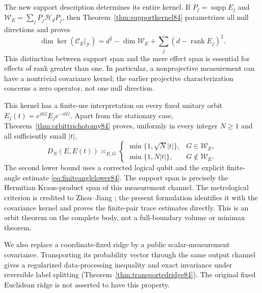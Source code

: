The new support description determines its entire kernel.  If
$P_j=\operatorname{supp}E_j$ and
$\mathcal W_E=\sum_jP_j\mathcal H_dP_j$, then
Theorem~\ref{thm:supportkernel84} parametrizes all null directions
and proves
\[
 \dim\ker(\mathcal C_E|_{\mathcal T})
 =d^2-\dim\mathcal W_E+\sum_j(d-\operatorname{rank}E_j)^2.
\]
This distinction between support span and the mere effect span is
essential for effects of rank greater than one.  In particular,
a nonprojective measurement can have a nontrivial covariance kernel;
the earlier projective characterization concerns a zero operator,
not one null direction.

This kernel has a finite-use interpretation on every fixed unitary
orbit $E_j(t)=e^{itG}E_je^{-itG}$.  Apart from the stationary case,
Theorem~\ref{thm:orbittrichotomy84} proves, uniformly in every integer
$N\ge1$ and all sufficiently small $|t|$,
\begin{equation}\label{eq:frontorbit84}
 D_N(E,E(t))\asymp_{E,G}
 \begin{cases}
 \min\{1,\sqrt N|t|\},&G\in\mathcal W_E,\\
 \min\{1,N|t|\},&G\notin\mathcal W_E.
 \end{cases}
\end{equation}
The second lower bound uses a corrected logical qubit and the explicit
finite-angle estimate \eqref{eq:finiteanglelower84}.
The support span is precisely the Hermitian Kraus-product span of
this measurement channel.  The metrological criterion is credited
to Zhou--Jiang \cite{ZJ84}; the present formulation identifies it
with the covariance kernel and proves the finite-pair trace estimates
directly.  This is an orbit theorem on the complete body, not a
full-boundary volume or minimax theorem.

We also replace a coordinate-fixed ridge by a public scalar-measurement
covariance.  Transporting its probability vector through the same
output channel gives a regularized data-processing inequality and
exact invariance under reversible label splitting
(Theorem~\ref{thm:transportedridge84}).  The original fixed Euclidean
ridge is not asserted to have this property.

